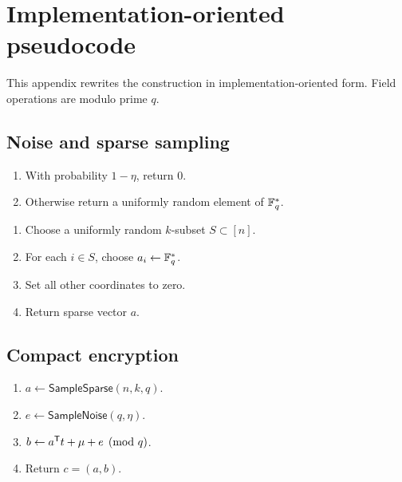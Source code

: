 \section{Implementation-oriented pseudocode}
\label{app:pseudocode}

This appendix rewrites the construction in implementation-oriented form.  Field operations are modulo prime $q$.

\subsection{Noise and sparse sampling}

\begin{algobox}
\begin{enumerate}
    \item With probability $1-\eta$, return $0$.
    \item Otherwise return a uniformly random element of $\mathbb{F}_q^*$.
\end{enumerate}
\end{algobox}

\begin{algobox}
\begin{enumerate}
    \item Choose a uniformly random $k$-subset $S\subset[n]$.
    \item For each $i\in S$, choose $a_i\leftarrow\mathbb{F}_q^*$.
    \item Set all other coordinates to zero.
    \item Return sparse vector $a$.
\end{enumerate}
\end{algobox}

\subsection{Compact encryption}

\begin{algobox}
\begin{enumerate}
    \item $a\leftarrow\mathsf{SampleSparse}(n,k,q)$.
    \item $e\leftarrow\mathsf{SampleNoise}(q,\eta)$.
    \item $b\leftarrow a^{\mathsf T} t+\mu+e\pmod q$.
    \item Return $c=(a,b)$.
\end{enumerate}
\end{algobox}

